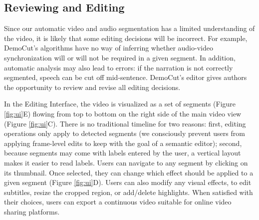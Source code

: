 \vfill
\subsection{Reviewing and Editing}
Since our automatic video and audio segmentation has a limited understanding of the video, it is likely that some editing decisions will be incorrect. For example, DemoCut's algorithms have no way of inferring whether audio-video synchronization will or will not be required in a given segment. In addition, automatic analysis may also lead to errors: if the narration is not correctly segmented, speech can be cut off mid-sentence. DemoCut's editor gives authors the opportunity to review and revise all editing decisions.

In the Editing Interface, the video is visualized as a set of segments (Figure \ref{fig:ui}E) flowing from top to bottom on the right side of the main video view (Figure \ref{fig:ui}C). There is no traditional timeline for two reasons: first, editing operations only apply to detected segments (we consciously prevent users from applying frame-level edits to keep with the goal of a semantic editor); second, because segments may come with labels entered by the user, a vertical layout makes it easier to read labels. Users can navigate to any segment by clicking on its thumbnail. Once selected, they can change which effect should be applied to a given segment (Figure \ref{fig:ui}D). Users can also modify any visual effects, to edit subtitles, resize the cropped region, or add/delete highlights. When satisfied with their choices, users can export a continuous video suitable for online video sharing platforms.




